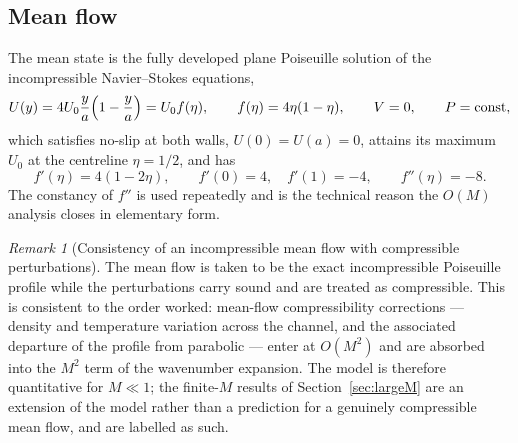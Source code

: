\documentclass[11pt,a4paper]{article}
\theoremstyle{plain}
\theoremstyle{remark}
\newtheorem{remark}[theorem]{Remark}
\begin{document}
\subsection{Mean flow}
The mean state is the fully developed plane Poiseuille solution of the incompressible Navier--Stokes
equations,
\begin{equation}
U(y)=4U_0\frac{y}{a}\Bigl(1-\frac{y}{a}\Bigr)=U_0f(\eta),\qquad
f(\eta)=4\eta(1-\eta),\qquad V=0,\qquad P=\mathrm{const},
\label{eq:meanflow}
\end{equation}
which satisfies no-slip at both walls, $U(0)=U(a)=0$, attains its maximum $U_0$ at the centreline
$\eta=1/2$, and has
\begin{equation}
f'(\eta)=4(1-2\eta),\qquad f'(0)=4,\quad f'(1)=-4,\qquad f''(\eta)=-8 .
\label{eq:fprops}
\end{equation}
The constancy of $f''$ is used repeatedly and is the technical reason the $O(M)$ analysis closes in
elementary form.

\begin{remark}[Consistency of an incompressible mean flow with compressible perturbations]
The mean flow is taken to be the exact incompressible Poiseuille profile while the perturbations
carry sound and are treated as compressible. This is consistent to the order worked: mean-flow
compressibility corrections --- density and temperature variation across the channel, and the
associated departure of the profile from parabolic --- enter at $O(M^2)$ and are absorbed into the
$M^2$ term of the wavenumber expansion. The model is therefore quantitative for $M\ll1$; the
finite-$M$ results of Section~\ref{sec:largeM} are an extension of the model rather than a prediction
for a genuinely compressible mean flow, and are labelled as such.
\end{remark}
\end{document}
